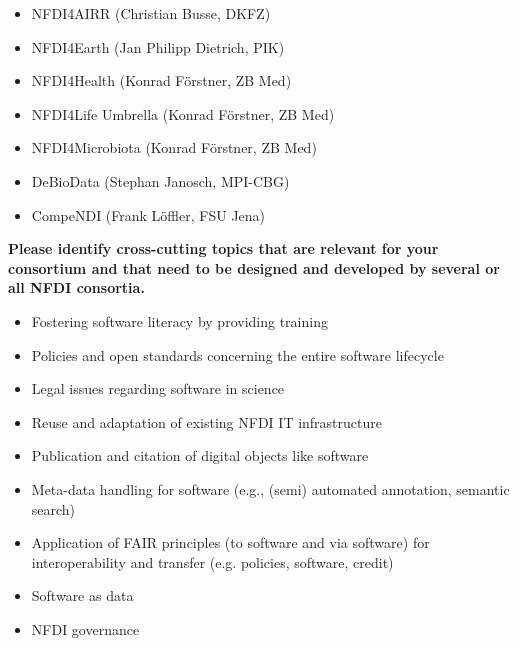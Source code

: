 \documentclass[11pt,a4paper,DIV=11]{scrlttr2}
\begin{document}
\begin{letter}{}
\begin{itemize}
\begin{itemize}
 \setlength\itemsep{0em}
 \item NFDI4AIRR (Christian Busse, DKFZ)
 \item NFDI4Earth (Jan Philipp Dietrich, PIK)
 \item NFDI4Health (Konrad Förstner, ZB Med)
 \item NFDI4Life Umbrella (Konrad Förstner, ZB Med)
 \item NFDI4Microbiota (Konrad Förstner, ZB Med)
 \item DeBioData (Stephan Janosch, MPI-CBG)
 \item CompeNDI (Frank Löffler, FSU Jena)
\end{itemize}
\end{itemize}


\textbf{Please identify cross-cutting topics that are relevant for your consortium and that
need to be designed and developed by several or all NFDI consortia.}\\
\begin{itemize}
\item Fostering software literacy by providing training
\item Policies and open standards concerning the entire software lifecycle
\item Legal issues regarding software in science
\item Reuse and adaptation of existing NFDI IT infrastructure
\item Publication and citation of digital objects like software
\item Meta-data handling for software (e.g., (semi) automated annotation, semantic search)
\item Application of FAIR principles (to software and via software) for interoperability and transfer (e.g. policies, software, credit)
\item Software as data 
\item NFDI governance
\end{itemize}


\end{letter}
\end{document}
